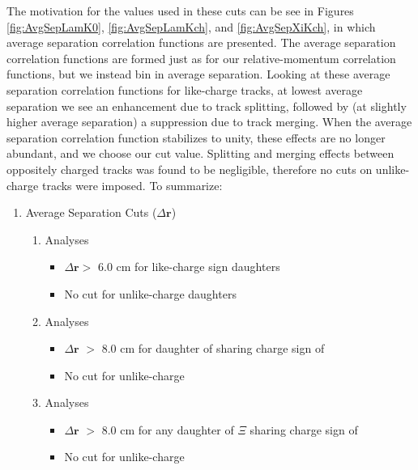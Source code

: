 \documentclass[/home/jesse/Analysis/FemtoAnalysis/AnalysisNotes/AnalysisNoteJBuxton.tex]{subfiles}
\begin{document}
The motivation for the values used in these cuts can be see in Figures \ref{fig:AvgSepLamK0}, \ref{fig:AvgSepLamKch}, and \ref{fig:AvgSepXiKch}, in which average separation correlation functions are presented.
The average separation correlation functions are formed just as for our relative-momentum correlation functions, but we instead bin in average separation.
Looking at these average separation correlation functions for like-charge tracks, at lowest average separation we see an enhancement due to track splitting, followed by (at slightly higher average separation) a suppression due to track merging.
When the average separation correlation function stabilizes to unity, these effects are no longer abundant, and we choose our cut value.
Splitting and merging effects between oppositely charged tracks was found to be negligible, therefore no cuts on unlike-charge tracks were imposed. To summarize:


\begin{enumerate}
 \item[] Average Separation Cuts ($\Delta\mathbf{r}$)
 \begin{enumerate}
  \item \LamKs Analyses
  \begin{itemize}
   \item $\Delta\mathbf{r} >$ 6.0 cm for like-charge sign daughters
   \item No cut for unlike-charge daughters
  \end{itemize}
  \item \LamKpm Analyses
  \begin{itemize}
   \item $\Delta\mathbf{r}$ $>$ 8.0 cm for daughter of \LamALam sharing charge sign of \Kpm
   \item No cut for unlike-charge
  \end{itemize}
  \item \XiKpm Analyses
  \begin{itemize}
   \item $\Delta\mathbf{r}$ $>$ 8.0 cm for any daughter of $\Xi$ sharing charge sign of \Kpm
   \item No cut for unlike-charge
  \end{itemize}  
 \end{enumerate}
\end{enumerate}
\end{document}
